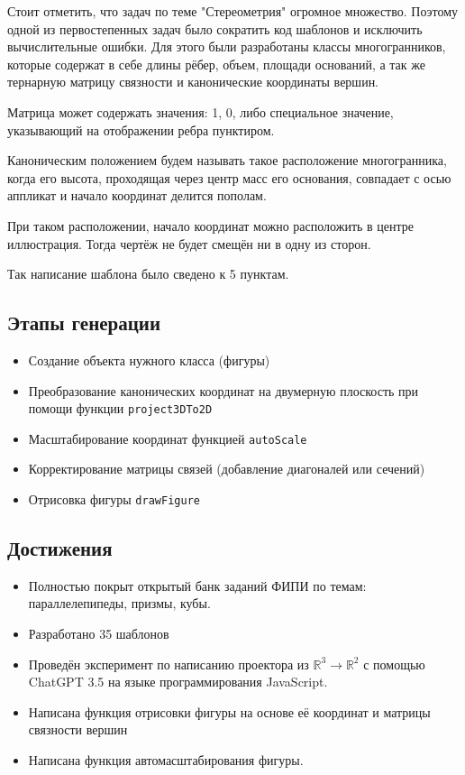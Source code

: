 \documentclass[a4paper, 12pt]{extarticle}
\begin{document}
Стоит отметить, что задач по теме "Стереометрия" огромное множество. Поэтому одной из первостепенных задач было сократить код шаблонов и исключить вычислительные ошибки. Для этого были разработаны классы многогранников, которые содержат в себе длины рёбер, объем, площади оснований, а так же тернарную матрицу связности и канонические координаты вершин.

Матрица может содержать значения: 1, 0, либо специальное значение, указывающий на отображении ребра пунктиром.

Каноническим положением будем называть такое расположение многогранника, когда его высота, проходящая через центр масс его основания, совпадает с осью аппликат и начало координат делится пополам.

При таком расположении, начало координат можно расположить в центре иллюстрация. Тогда чертёж не будет смещён ни в одну из сторон.

Так написание шаблона было сведено к 5 пунктам.

\subsection*{Этапы генерации}
\begin{itemize}
	\item Создание объекта нужного класса (фигуры)
	\item Преобразование канонических координат на двумерную плоскость при помощи функции \texttt{project3DTo2D}
	\item Масштабирование координат функцией \texttt{autoScale}
	\item Корректирование матрицы связей (добавление диагоналей или сечений)
	\item Отрисовка фигуры \texttt{drawFigure}
\end{itemize}

\subsection*{Достижения}
\begin{itemize}
	\item Полностью покрыт открытый банк заданий ФИПИ по темам: параллелепипеды, призмы, кубы.
	\item Разработано 35 шаблонов
	\item Проведён эксперимент по написанию проектора из $\mathbb{R}^3 \to \mathbb{R}^2$ с помощью ChatGPT 3.5 на языке программирования JavaScript.
	\item Написана функция отрисовки фигуры на основе её координат и матрицы связности вершин
	\item Написана функция автомасштабирования фигуры.
\end{itemize}
\end{document}
